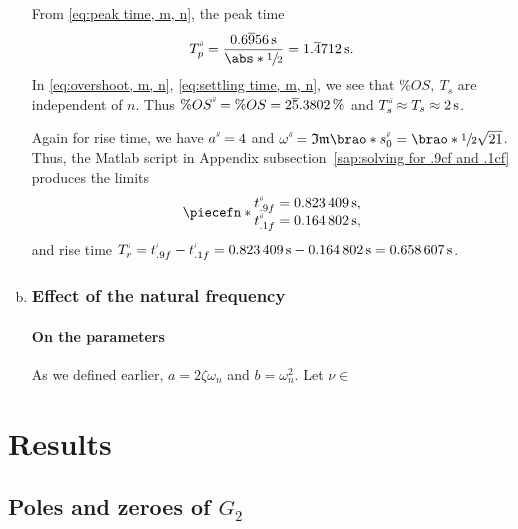\documentclass[12pt]{article}
\newcommand*\siexpr[2][]{\SI[parse-numbers=false,#1]{#2}}%
\DeclarePairedDelimiter\brao()%
\DeclarePairedDelimiter\abs||
\DeclarePairedDelimiter\piecefn\{.
\newcommand{\setprime}[2][1]{%
    {#2}^{%
        \raisebox{1pt}{%
            \scalebox{0.5}{%
                \itshape\sffamily\uppercase%
                \expandafter{%
                    \romannumeral#1%
                }%
            }%
        }
    }%
}%
\begin{document}
\begin{enumerate}[(a)]
        From \eqref{eq:peak time, m, n}, the peak time
        \begin{equation}
            \setprime[2]{T}_p = \frac{\siexpr{0.6\overline956}\second}{\abs*{\sfrac12}} = \siexpr{1.\overline4712}\second.
        \end{equation}
        In \eqref{eq:overshoot, m, n}, \eqref{eq:settling time, m, n},
        we see that $\%OS,\ T_s$ are independent of $n$.
        Thus $\%\setprime[2]{OS} = \%OS = \siexpr{2\overline5.3802}\percent$ and $\setprime[2]{T}_s \approx T_s \approx \SI2\second$.

        Again for rise time, we have $\setprime[2]a = 4$ and $\setprime[2]\omega = \mathfrak{Im}\brao*{\setprime[2]s_0} = \brao*{\sfrac12}\sqrt{21}$.
        Thus, the Matlab script in Appendix subsection~\ref{sap:solving for .9cf and .1cf} produces the limits
        \begin{equation}
            \piecefn*{
                \begin{array}{@{}l@{}}
                    \setprime[2]t_{.9f} = \SI{0.823409}\second,
                \\*
                    \setprime[2]t_{.1f} = \SI{0.164802}\second,
                \\*
                \end{array}
            }
        \end{equation}
        and rise time $\setprime{T}_r = \setprime{t}_{.9f} - \setprime{t}_{.1f} = \SI{0.823409}\second - \SI{0.164802}\second = \SI{0.658607}\second$.

    \item
        \subsubsection{Effect of the natural frequency}

        \paragraph{On the parameters}
        As we defined earlier, $a = 2\zeta\omega_n$ and $b = \omega_n^2$.
        Let $\nu \in $ 
\end{enumerate}



\section{Results}

\subsection{Poles and zeroes of $G_2$}
\end{document}
